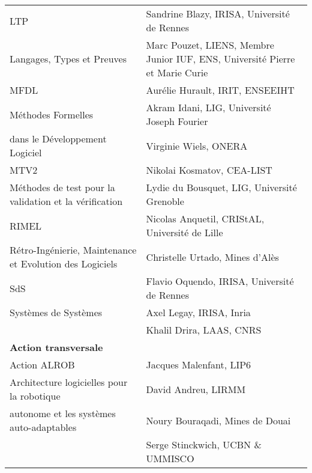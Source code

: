 \documentclass[11pt]{article}
\begin{document}
{\begin{tabular}{|p{6cm}p{8.5cm}|}
LTP & Sandrine Blazy, IRISA, Université de Rennes\\
\footnotesize Langages, Types et Preuves 
    & Marc Pouzet,  LIENS, Membre Junior IUF, ENS, Université Pierre et Marie Curie\\
\hline

MFDL 
& Aurélie Hurault, IRIT, ENSEEIHT\\
\footnotesize  Méthodes Formelles
& Akram Idani, LIG, Université Joseph Fourier\\
\footnotesize  dans le Développement Logiciel 
& Virginie Wiels, ONERA\\
\hline

MTV2 &Nikolai Kosmatov, CEA-LIST\\
\footnotesize Méthodes de test pour la validation et la vérification  
     & Lydie du Bousquet, LIG, Université Grenoble\\
\hline

RIMEL 
& Nicolas Anquetil, CRIStAL, Université de Lille\\
\footnotesize Rétro-Ingénierie, Maintenance et Evolution des Logiciels
& Christelle Urtado, Mines d'Alès\\
\hline

SdS 
& Flavio Oquendo, IRISA, Université de Rennes\\
\footnotesize Systèmes de Systèmes
& Axel Legay, IRISA, Inria\\
& Khalil Drira, LAAS, CNRS\\

\hline 
\textbf{Action transversale}&\\
\hline 

Action ALROB & Jacques Malenfant, LIP6\\
\footnotesize
Architecture logicielles pour la robotique 
             &David Andreu, LIRMM\\
\footnotesize
autonome et les systèmes auto-adaptables
             &Noury Bouraqadi, Mines de Douai\\
             &Serge Stinckwich, UCBN \& UMMISCO\\
\hline

\hline


\hline
		\end{tabular}
}

\medskip
\end{document}
